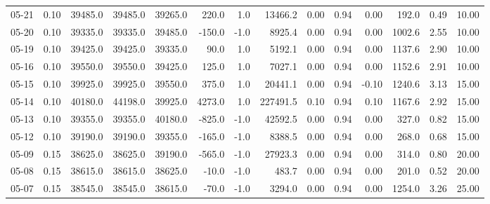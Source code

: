 \begin{threeparttable}
{\begin{tabular}{lrrrrrrrrrrrrr}
  05-21 &     0.10 & 39485.0 & 39485.0 & 39265.0 &      220.0 &                      1.0 &             13466.2 &       0.00 &      0.94 &           0.00 &            192.0 &            0.49 &                  10.00 \\
  05-20 &     0.10 & 39335.0 & 39335.0 & 39485.0 &     -150.0 &                     -1.0 &              8925.4 &       0.00 &      0.94 &           0.00 &           1002.6 &            2.55 &                  10.00 \\
  05-19 &     0.10 & 39425.0 & 39425.0 & 39335.0 &       90.0 &                      1.0 &              5192.1 &       0.00 &      0.94 &           0.00 &           1137.6 &            2.90 &                  10.00 \\
  05-16 &     0.10 & 39550.0 & 39550.0 & 39425.0 &      125.0 &                      1.0 &              7027.1 &       0.00 &      0.94 &           0.00 &           1152.6 &            2.91 &                  10.00 \\
  05-15 &     0.10 & 39925.0 & 39925.0 & 39550.0 &      375.0 &                      1.0 &             20441.1 &       0.00 &      0.94 &          -0.10 &           1240.6 &            3.13 &                  15.00 \\
  05-14 &     0.10 & 40180.0 & 44198.0 & 39925.0 &     4273.0 &                      1.0 &            227491.5 &       0.10 &      0.94 &           0.10 &           1167.6 &            2.92 &                  15.00 \\
  05-13 &     0.10 & 39355.0 & 39355.0 & 40180.0 &     -825.0 &                     -1.0 &             42592.5 &       0.00 &      0.94 &           0.00 &            327.0 &            0.82 &                  15.00 \\
  05-12 &     0.10 & 39190.0 & 39190.0 & 39355.0 &     -165.0 &                     -1.0 &              8388.5 &       0.00 &      0.94 &           0.00 &            268.0 &            0.68 &                  15.00 \\
  05-09 &     0.15 & 38625.0 & 38625.0 & 39190.0 &     -565.0 &                     -1.0 &             27923.3 &       0.00 &      0.94 &           0.00 &            314.0 &            0.80 &                  20.00 \\
  05-08 &     0.15 & 38615.0 & 38615.0 & 38625.0 &      -10.0 &                     -1.0 &               483.7 &       0.00 &      0.94 &           0.00 &            201.0 &            0.52 &                  20.00 \\
  05-07 &     0.15 & 38545.0 & 38545.0 & 38615.0 &      -70.0 &                     -1.0 &              3294.0 &       0.00 &      0.94 &           0.00 &           1254.0 &            3.26 &                  25.00 \\

\end{tabular}}
\end{threeparttable}
